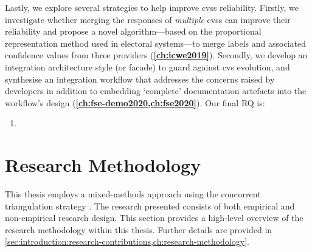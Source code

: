 Lastly, we explore several strategies to help improve \glspl{cvs} reliability. Firstly, we investigate whether merging the responses of \textit{multiple} \glspl{cvs} can improve their reliability and propose a novel algorithm---based on the proportional representation method used in electoral systems---to merge labels and associated confidence values from three providers (\textbf{\cref{ch:icwe2019}}). Secondly, we develop an integration architecture style (or facade) to guard against \gls{cvs} evolution, and synthesise an integration workflow that addresses the concerns raised by developers in addition to embedding `complete' documentation artefacts into the workflow's design (\textbf{\cref{ch:fse-demo2020,ch:fse2020}}). Our final RQ is:

\begin{leftbar}
\begin{enumerate}[label=\faQuestionCircle~~\textbf{RQ\arabic*.}, ref=RQ\arabic*, leftmargin=2.5\parindent, rightmargin=1\parindent,start=4]
  \item \textbf{\RQFourDesign{}}\label{rq:design}
\end{enumerate}
\end{leftbar}

\section{Research Methodology}

This thesis employs a mixed-methods approach using the concurrent triangulation strategy \citep{Jick:1979el,Bratthall2002}. The research presented consists of both empirical and non-empirical research design. This section provides a high-level overview of the research methodology within this thesis. Further details are provided in  \cref{sec:introduction:research-contributions,ch:research-methodology}.

